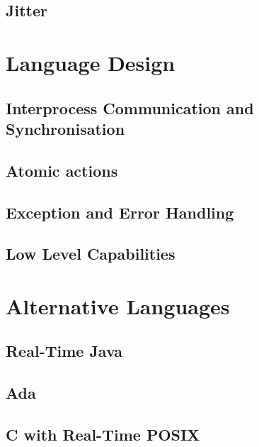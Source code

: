 \subsection{Jitter}

\section{Language Design}
\subsection{Interprocess Communication and Synchronisation}
\subsection{Atomic actions}
\subsection{Exception and Error Handling}
\subsection{Low Level Capabilities}

\section{Alternative Languages}
\subsection{Real-Time Java}
\subsection{Ada}
\subsection{C with Real-Time POSIX}
